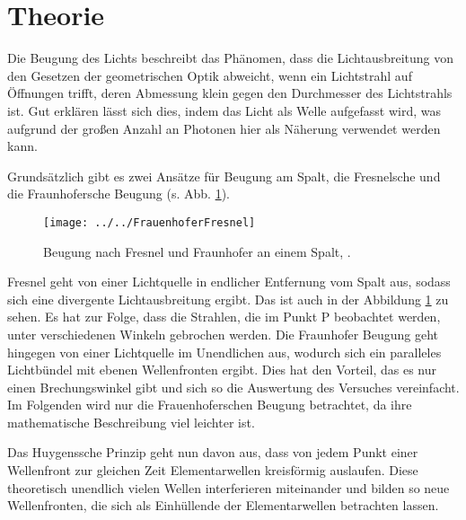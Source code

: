 \section{Theorie}
\label{sec:Theorie}
Die Beugung des Lichts beschreibt das Phänomen, dass die Lichtausbreitung von den Gesetzen der geometrischen Optik abweicht, wenn ein Lichtstrahl auf Öffnungen trifft, deren Abmessung klein gegen den Durchmesser des Lichtstrahls ist. Gut erklären lässt sich dies, indem das Licht als Welle aufgefasst wird, was aufgrund der großen Anzahl an Photonen hier als Näherung verwendet werden kann. 

Grundsätzlich gibt es zwei Ansätze für Beugung am Spalt, die Fresnelsche und die Fraunhofersche Beugung (s. Abb. \ref{fig:frauenhoferfresnel}). 

\begin{figure}[h!]
	\centering
	\texttt{[image: ../../FrauenhoferFresnel]}
	\caption{Beugung nach Fresnel und Fraunhofer an einem Spalt, \cite[2]{anleitung406}.}
	\label{fig:frauenhoferfresnel}
\end{figure}

Fresnel geht von einer Lichtquelle in endlicher Entfernung vom Spalt aus, sodass sich eine divergente Lichtausbreitung ergibt. Das ist auch in der Abbildung \ref{fig:frauenhoferfresnel} zu sehen. Es hat zur Folge, dass die Strahlen, die im Punkt P beobachtet werden, unter verschiedenen Winkeln gebrochen werden. Die Fraunhofer Beugung geht hingegen von einer Lichtquelle im Unendlichen aus, wodurch sich ein paralleles Lichtbündel mit ebenen Wellenfronten ergibt. Dies hat den Vorteil, das es nur einen Brechungswinkel gibt und sich so die Auswertung des Versuches vereinfacht. Im Folgenden wird nur die Frauenhoferschen Beugung betrachtet, da ihre mathematische Beschreibung viel leichter ist. 

Das Huygenssche Prinzip geht nun davon aus, dass von jedem Punkt einer Wellenfront zur gleichen Zeit Elementarwellen kreisförmig auslaufen. Diese theoretisch unendlich vielen Wellen interferieren miteinander und bilden so neue Wellenfronten, die sich als Einhüllende der Elementarwellen betrachten lassen. 

